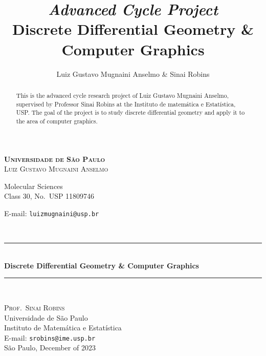 \documentclass[11pt,reqno]{amsart}
\newcommand{\HRule}{\rule{\linewidth}{0.5mm}} %
\theoremstyle{definition}
\begin{document}
\begin{titlepage}
 \vfill
  \begin{center}
       \textsc{\LARGE \textbf{Universidade de São Paulo}} \\[2.0cm]

       \vskip 0.5cm
       \textsc{\large Luiz Gustavo Mugnaini Anselmo}

       {\normalsize Molecular Sciences \\
         Class 30, No.~USP 11809746

       E-mail: \texttt{luizmugnaini@usp.br}}\\[2.0cm]

       \HRule\\
       \vskip 0.5cm
       {\LARGE \textbf{Discrete Differential Geometry \& Computer Graphics}}
       \HRule\\[1.5cm]

       \hspace{.45\textwidth}
       \begin{minipage}{.5\textwidth}

       \textsc{\large Prof.~Sinai Robins}\\
       Universidade de São Paulo \\
       Instituto de Matemática e Estatística \\
       E-mail: \texttt{srobins@ime.usp.br}\\[1cm]

       \normalsize São Paulo, December of 2023
       \end{minipage}
  \end{center}
\end{titlepage}

\title[Discrete Differential Geometry \& Computer Graphics]{%
{\footnotesize\sl Advanced Cycle Project} \\ \smallskip
    Discrete Differential Geometry \& Computer Graphics
}%

\author{%
    Luiz Gustavo Mugnaini Anselmo \& Sinai Robins
}%

\address{%
    Instituto de Matemática e Estatística, Universidade de São
    Paulo, Rua do Matão 1010, 05508--090~São Paulo, SP
}%


\begin{abstract}
    This is the advanced cycle research project of Luiz Gustavo Mugnaini Anselmo, supervised by
    Professor Sinai Robins at the Instituto de matemática e Estatística, USP. The goal of the
    project is to study discrete differential geometry and apply it to the area of computer
    graphics.
\end{abstract}
\end{document}

